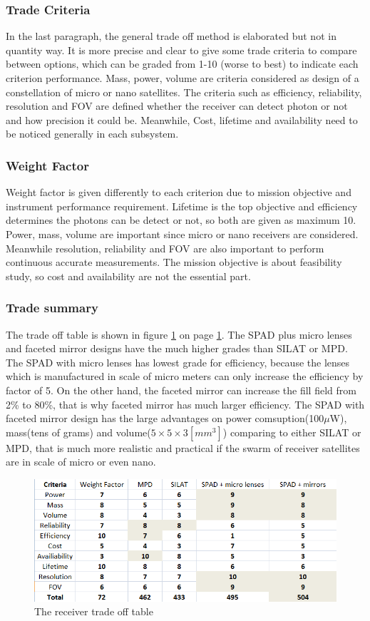 \subsubsection{Trade Criteria}
\label{TOReceiverC}
In the last paragraph, the general trade off method is elaborated but not in quantity way. It is more precise and clear to give some trade criteria to compare between options, which can be graded from 1-10 (worse to best) to indicate each criterion performance. Mass, power, volume are criteria considered as design of a constellation of micro or nano satellites. The criteria such as efficiency, reliability, resolution and \ac{FOV} are defined whether the receiver can detect photon or not and how precision it could be. Meanwhile, Cost, lifetime and availability need to be noticed generally in each subsystem.

\subsubsection{Weight Factor}
\label{TOReceiverWF}
Weight factor is given differently to each criterion due to mission objective and instrument performance requirement. Lifetime is the top objective and efficiency determines the photons can be detect or not, so both are given as maximum 10. Power, mass, volume are important since micro or nano receivers are considered. Meanwhile resolution, reliability and \acs{FOV} are also important to perform continuous accurate measurements. The mission objective is about feasibility study, so cost and availability are not the essential part.

\subsubsection{Trade summary}
\label{TOReceiverS}
The trade off table is shown in figure \ref{fig:receiver_tradeoff} on page \ref{fig:receiver_tradeoff}. The \acs{SPAD} plus micro lenses and faceted mirror designs have the much higher grades than \acs{SILAT} or \acs{MPD}. The \acs{SPAD} with micro lenses has lowest grade for efficiency, because the lenses which is manufactured in scale of micro meters can only increase the efficiency by factor of 5. On the other hand, the faceted mirror can increase the fill field from 2\% to 80\%, that is why faceted mirror has much larger efficiency. The \acs{SPAD} with faceted mirror design has the large advantages on power comsuption(100$\mu$W), mass(tens of grams) and volume($5\times5\times3[mm^{3}]$) comparing to either \acs{SILAT} or \acs{MPD}, that is much more realistic and practical if the swarm of receiver satellites are in scale of micro or even nano. 

\begin{figure}
\centering
\includegraphics[scale = 1]{chapters/img/Receiver_tradeoff.png}
\caption{The receiver trade off table}
\label{fig:receiver_tradeoff}
\end{figure}

